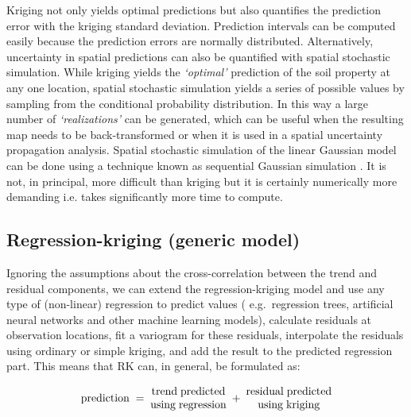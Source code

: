 \documentclass[11pt]{krantz}
\theoremstyle{definition}
\theoremstyle{definition}
\theoremstyle{definition}
\theoremstyle{remark}
\begin{document}
Kriging not only yields optimal predictions but also quantifies the
prediction error with the kriging standard deviation. Prediction
intervals can be computed easily because the prediction errors are
normally distributed. Alternatively, uncertainty in spatial predictions
can also be quantified with spatial stochastic simulation. While kriging
yields the \emph{`optimal'} prediction of the soil property at any one
location, spatial stochastic simulation yields a series of possible
values by sampling from the conditional probability distribution. In
this way a large number of \emph{`realizations'} can be generated, which
can be useful when the resulting map needs to be back-transformed or
when it is used in a spatial uncertainty propagation analysis. Spatial
stochastic simulation of the linear Gaussian model can be done using a
technique known as sequential Gaussian simulation
\citep{Goovaerts1997Oxford, Yamamoto2008}. It is not, in principal, more
difficult than kriging but it is certainly numerically more demanding
i.e. takes significantly more time to compute.

\hypertarget{RK-generic}{%
\subsection{Regression-kriging (generic model)}\label{RK-generic}}

Ignoring the assumptions about the cross-correlation between the trend
and residual components, we can extend the regression-kriging model and
use any type of (non-linear) regression to predict values (
e.g.~regression trees, artificial neural networks and other machine
learning models), calculate residuals at observation locations, fit a
variogram for these residuals, interpolate the residuals using ordinary
or simple kriging, and add the result to the predicted regression part.
This means that RK can, in general, be formulated as:

\begin{equation}
{\rm prediction} \; = \;
\begin{matrix}
{\rm trend} \; {\rm predicted} \\
{\rm using} \; {\rm regression} \end{matrix} \; + \;
\begin{matrix}
{\rm residual} \; {\rm predicted} \\
{\rm using} \; {\rm kriging} \end{matrix}
\label{eq:RKgeneral}
\end{equation}
\end{document}
